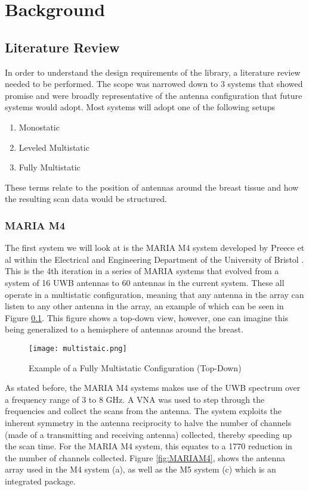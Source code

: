\chapter*{Background}
\section{Literature Review}
In order to understand the design requirements of the library, a literature review needed to be performed. The scope was
narrowed down to 3 systems that showed promise and were broadly representative of the antenna configuration that future
systems would adopt. Most systems will adopt one of the following setups
\begin{enumerate}
    \item Monostatic
    \item Leveled Multistatic
    \item Fully Multistatic
\end{enumerate}
\noindent These terms relate to the position of antennas around the breast tissue and how the resulting scan data would
be structured. \hfill \break

\subsection{MARIA M4}
The first system we will look at is the MARIA M4 system developed by Preece et al within the Electrical and Engineering
Department of the University of Bristol \cite{preeceMARIAM4Clinical2016}. This is the 4th iteration in a series of MARIA systems that evolved from a
system of 16 UWB antennas to 60 antennas in the current system. These all operate in a multistatic configuration,
meaning that any antenna in the array can listen to any other antenna in the array, an example of which can be seen in
Figure \ref{fig:MultistaticExample}. This figure shows a top-down view, however, one can imagine this being generalized
to a hemisphere of antennas around the breast. \hfill

\begin{figure}
    \texttt{[image: multistaic.png]}
    \centering
    \caption{Example of a Fully Multistatic Configuration (Top-Down)}
    \label{fig:MultistaticExample}
\end{figure}

\noindent As stated before, the MARIA M4 systems makes use of the UWB spectrum over a frequency range of 3 to 8 GHz. A
VNA was used to step through the frequencies and collect the scans from the antenna. The system exploits the inherent
symmetry in the antenna reciprocity to halve the number of channels (made of a transmitting and receiving antenna)
collected, thereby speeding up the scan time. For the MARIA M4 system, this equates to a 1770 reduction in the number of
channels collected. Figure \ref{fig:MARIAM4}, shows the antenna array used in the M4 system (a), as well as the M5
system (c) which is an integrated package.


